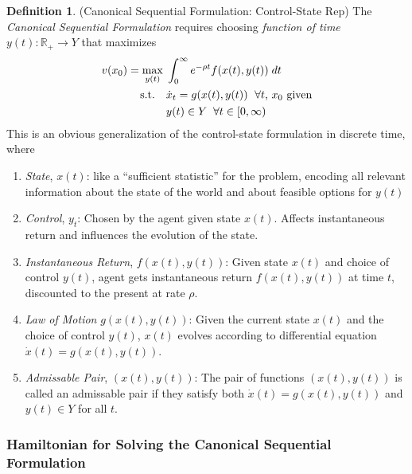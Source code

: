 \documentclass[12pt]{article}
\numberwithin{equation}{section} %
\theoremstyle{plain}
\theoremstyle{definition}
\newtheorem{defn}[thm]{Definition}
\theoremstyle{remark}
\newcommand{\ra}{\rightarrow}
\newcommand{\R}{\mathbb{R}}
\begin{document}
\begin{defn}{(Canonical Sequential Formulation: Control-State Rep)}
\label{defn:sequential-altrep-cts}
The \emph{Canonical Sequential Formulation} requires choosing
\emph{function of time} $y(t):\R_+\ra Y$ that maximizes
\begin{align}
  \label{prob:cts-dynamic}
  v(x_0)
  =
  \max_{y(t)}\;
  &\int_0^\infty e^{-\rho t} f(x(t),y(t)) \; dt
  \notag\\
  \text{s.t.}\quad
  &\text{$\dot{x}_{t} = g(x(t),y(t))$ $\;\forall t$, $x_0$ given}
  \notag\\
  &
  y(t) \in Y \;\; \forall t\in[0,\infty)
\end{align}
This is an obvious generalization of the control-state formulation in
discrete time, where
\begin{enumerate}
  \item \emph{State}, $x(t)$:
    like a ``sufficient statistic'' for the problem, encoding all
    relevant information about the state of the world and about feasible
    options for $y(t)$

  \item \emph{Control}, $y_{t}$: Chosen by the agent given state $x(t)$.
    Affects instantaneous return and influences the evolution of the
    state.

  \item \emph{Instantaneous Return}, $f(x(t),y(t))$: Given state $x(t)$ and
    choice of control $y(t)$, agent gets instantaneous return
    $f(x(t),y(t))$ at time $t$, discounted to the present at rate
    $\rho$.

  \item \emph{Law of Motion} $g(x(t),y(t))$: Given the current state $x(t)$
    and the choice of control $y(t)$,
    $x(t)$ evolves according to differential equation
    $\dot{x}(t)=g(x(t),y(t))$.
  \item \emph{Admissable Pair}, $(x(t),y(t))$: The pair of functions
    $(x(t),y(t))$ is called an admissable pair if they satisfy both
    $\dot{x}(t) = g(x(t),y(t))$ and $y(t)\in Y$ for all $t$.
\end{enumerate}
\end{defn}



\clearpage
\subsubsection{Hamiltonian for Solving the Canonical Sequential
Formulation}
\end{document}
